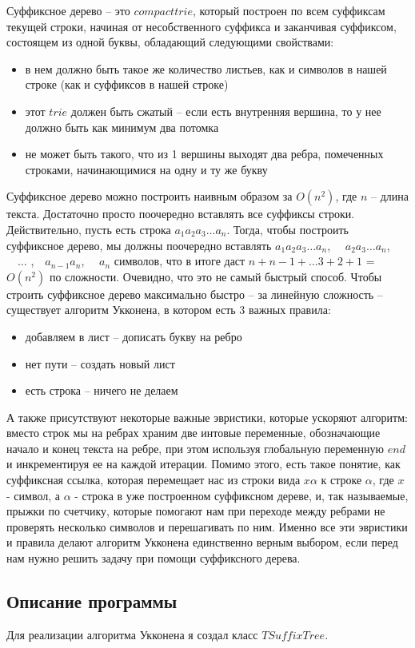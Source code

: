 \documentclass[12pt]{article}
\begin{document}
Суффиксное дерево – это $compact trie$, который построен по всем суффиксам текущей
строки, начиная от несобственного суффикса и заканчивая суффиксом, состоящем из одной
буквы, обладающий следующими свойствами:
\begin{itemize}
	\item в нем должно быть такое же количество листьев, как и символов в нашей строке (как и
	суффиксов в нашей строке)
	\item  этот $trie$ должен быть сжатый – если есть внутренняя вершина, то у нее должно быть как
	минимум два потомка
	\item не может быть такого, что из 1 вершины выходят два ребра, помеченных строками,
	начинающимися на одну и ту же букву
\end{itemize}
Суффиксное дерево можно построить наивным образом за $O(n^2)$, где $n$ – длина текста.
Достаточно просто поочередно вставлять все суффиксы строки. Действительно, пусть есть
строка $a_1a_2a_3\ldots a_n$. Тогда, чтобы построить суффиксное дерево, мы должны поочередно
вставлять $a_1a_2a_3\ldots a_n$, $\quad a_2a_3\ldots a_n$,$ \quad \ldots$ ,$\quad a_{n-1}a_n$, $ \quad a_n$ символов, что в итоге даст $n + {n-1} + \ldots 3 + 2 + 1$ = $O(n^2)$
по сложности. Очевидно, что это не самый быстрый способ. Чтобы строить суффиксное
дерево максимально быстро – за линейную сложность – существует алгоритм Укконена, в
котором есть 3 важных правила:
\begin{itemize}
	\item добавляем в лист – дописать букву на ребро
	\item  нет пути – создать новый лист
	\item есть строка – ничего не делаем
\end{itemize}
А также присутствуют некоторые важные эвристики, которые ускоряют алгоритм: вместо
строк мы на ребрах храним две интовые переменные, обозначающие начало и конец
текста на ребре, при этом используя глобальную переменную $end$ и инкрементируя ее на
каждой итерации. Помимо этого, есть такое понятие, как суффиксная ссылка, которая перемещает нас из строки вида $x\alpha$ к строке $\alpha$, где $x$ - символ, а $\alpha$ - строка в уже построенном суффиксном дереве, и, так называемые, прыжки по счетчику, которые помогают нам при переходе
между ребрами не проверять несколько символов и перешагивать по ним. Именно все эти
эвристики и правила делают алгоритм Укконена единственно верным выбором, если
перед нам нужно решить задачу при помощи суффиксного дерева.
	
	\subsection*{Описание программы}
	Для реализации алгоритма Укконена я создал класс $TSuffixTree$.
	
\end{document}
